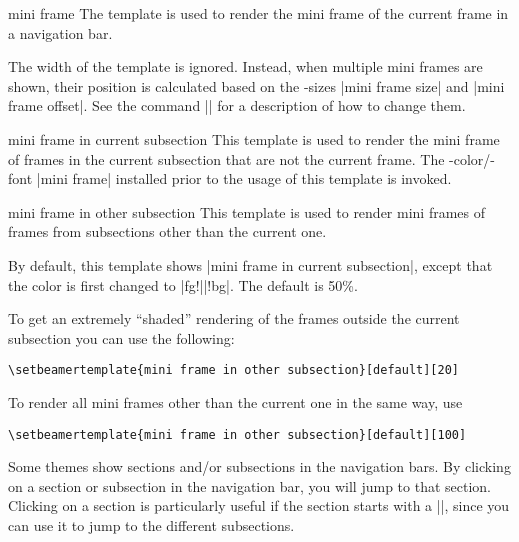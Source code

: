 \begin{element}{mini frame}\yes\yes\yes
  The template is used to render the mini frame of the current frame in a navigation bar.

  The width of the template is ignored. Instead, when multiple mini frames are shown, their position is calculated based on the \beamer-sizes |mini frame size| and |mini frame offset|. See the command |\setbeamersize| for a description of how to change them.
\end{element}

\begin{element}{mini frame in current subsection}\yes\no\no
  This template is used to render the mini frame of frames in the current subsection that are not the current frame. The \beamer-color/-font |mini frame| installed prior to the usage of this template is invoked.
\end{element}

\begin{element}{mini frame in other subsection}\yes\no\no
  This template is used to render mini frames of frames from subsections other than the current one.
  \begin{templateoptions}
    By default, this template shows |mini frame in current subsection|, except that the color is first changed to |fg!||!bg|. The default  is 50\%.

    \example
    To get an extremely ``shaded'' rendering of the frames outside the current subsection you can use the following:

\begin{verbatim}
\setbeamertemplate{mini frame in other subsection}[default][20]
\end{verbatim}

    \example
    To render all mini frames other than the current one in the same way, use
\begin{verbatim}
\setbeamertemplate{mini frame in other subsection}[default][100]
\end{verbatim}
  \end{templateoptions}
\end{element}

Some themes show sections and/or subsections in the navigation bars. By clicking on a section or subsection in the navigation bar, you will jump to that section. Clicking on a section is particularly useful if the section starts with a |\tableofcontents[currentsection]|, since you can use it to jump to the different subsections.

